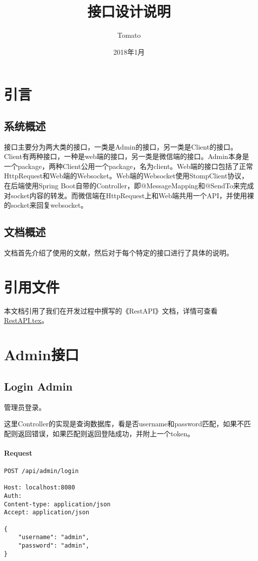 \documentclass{article}
\title{接口设计说明}
\author{Tomato}
\date{2018年1月}
\begin{document}
	\maketitle
		\section{引言}
			\subsection{系统概述}
				接口主要分为两大类的接口，一类是Admin的接口，另一类是Client的接口。Client有两种接口，一种是web端的接口，另一类是微信端的接口。Admin本身是一个package，两种Client公用一个package，名为client。Web端的接口包括了正常HttpRequest和Web端的Websocket。Web端的Websocket使用StompClient协议，在后端使用Spring Boot自带的Controller，即@MessageMapping和@SendTo来完成对socket内容的转发。而微信端在HttpRequest上和Web端共用一个API，并使用裸的socket来回复websocket。
			\subsection{文档概述}
				文档首先介绍了使用的文献，然后对于每个特定的接口进行了具体的说明。
		\section{引用文件}
			本文档引用了我们在开发过程中撰写的《RestAPI》文档，详情可查看\href{https://github.com/wenj/tomatodesign/blob/master/REST%20API.tex}{RestAPI.tex}。

		\section{Admin接口}

\subsection{Login Admin}
管理员登录。

这里Controller的实现是查询数据库，看是否username和password匹配，如果不匹配则返回错误，如果匹配则返回登陆成功，并附上一个token。

\paragraph*{Request}
\begin{lstlisting}
POST /api/admin/login

Host: localhost:8080
Auth:
Content-type: application/json
Accept: application/json

{
    "username": "admin",
    "password": "admin",
}
\end{lstlisting}
\end{document}
